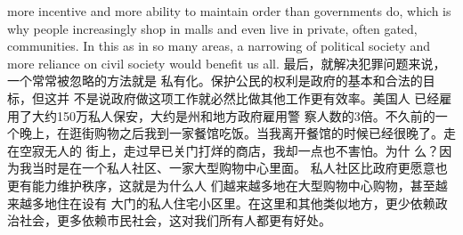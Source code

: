 \begin{paracol}{2}
more incentive and more ability to maintain order than governments do, which is why people increasingly shop in malls and
even live in private, often gated, communities. In this as in so
many areas, a narrowing of political society and more reliance
on civil society would benefit us all.
\switchcolumn
最后，就解决犯罪问题来说，一个常常被忽略的方法就是
私有化。保护公民的权利是政府的基本和合法的目标，但这并
不是说政府做这项工作就必然比做其他工作更有效率。美国人
已经雇用了大约150万私人保安，大约是州和地方政府雇用警
察人数的3倍。不久前的一个晚上，在逛街购物之后我到一家餐馆吃饭。当我离开餐馆的时候已经很晚了。走在空寂无人的
街上，走过早已关门打烊的商店，我却一点也不害怕。为什
么？因为我当时是在一个私人社区、一家大型购物中心里面。
私人社区比政府更愿意也更有能力维护秩序，这就是为什么人
们越来越多地在大型购物中心购物，甚至越来越多地住在设有
大门的私人住宅小区里。在这里和其他类似地方，更少依赖政
治社会，更多依赖市民社会，这对我们所有人都更有好处。


\end{paracol}
